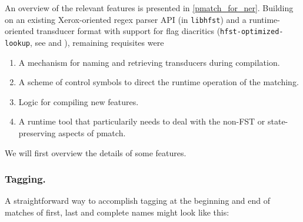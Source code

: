 \documentclass{llncs}
\begin{document}
An overview of the relevant features is presented in \ref{pmatch_for_ner}.
Building on an existing Xerox-oriented regex parser API (in \verb+libhfst+) and a
runtime-oriented transducer format with support for flag diacritics
(\verb+hfst-optimized-lookup+, see \cite{silfverberg/2009} and
\cite{hfst/2011}), remaining requisites were

\begin{enumerate}
\item A mechanism for naming and retrieving transducers during compilation.
\item A scheme of control symbols to direct the runtime operation of the matching.
\item Logic for compiling new features.
\item A runtime tool that particularily needs to deal with the non-FST or
state-preserving aspects of pmatch.
\end{enumerate}

We will first overview the details of some features.

\subsubsection{Tagging.}
A straightforward way to accomplish tagging at the beginning and end of matches
of first, last and complete names might look like this:

\end{document}
